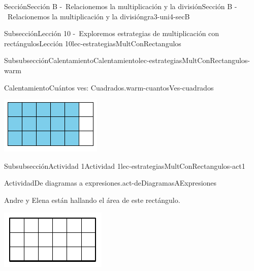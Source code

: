 \documentclass[twoside,10pt,]{article}
\begin{document}
\begin{sectionptx}{Sección}{Sección B -~Relacionemos la multiplicación y la división}{}{Sección B -~Relacionemos la multiplicación y la división}{}{}{gra3-uni4-secB}
\begin{subsectionptx}{Subsección}{Lección 10 -~Exploremos estrategias de multiplicación con rectángulos}{}{Lección 10}{}{}{lec-estrategiasMultConRectangulos}
\begin{subsubsectionptx}{Subsubsección}{Calentamiento}{}{Calentamiento}{}{}{lec-estrategiasMultConRectangulos-warm}
\begin{exploration}{Calentamiento}{Cuántos ves: Cuadrados.}{warm-cuantosVes-cuadrados}
\begin{sidebyside}{3}{0}{0}{0.05}
\begin{sbspanel}{0.3}
\includegraphics[width=\linewidth]{external/svg-source/tikz-file-147478.pdf}
\end{sbspanel}%
\end{sidebyside}%
\end{exploration}%
\end{subsubsectionptx}
%
%
\typeout{************************************************}
\typeout{************************************************}
%
\begin{subsubsectionptx}{Subsubsección}{Actividad 1}{}{Actividad 1}{}{}{lec-estrategiasMultConRectangulos-act1}
\begin{activity}{Actividad}{De diagramas a expresiones.}{act-deDiagramasAExpresiones}%
\begin{sidebyside}{2}{0.025}{0.025}{0.05}%
\begin{sbspanel}{0.4}%
Andre y Elena están hallando el área de este rectángulo.%
\end{sbspanel}%
\begin{sbspanel}{0.5}%
\includegraphics[width=\linewidth]{external/svg-source/tikz-file-153043.pdf}
\end{sbspanel}%

\end{sidebyside}
\end{activity}
\end{subsubsectionptx}
\end{subsectionptx}
\end{sectionptx}
\end{document}
